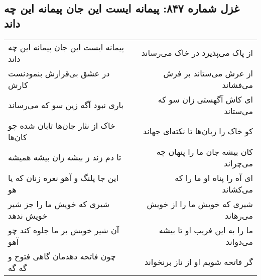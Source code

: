 \begin{center}
\section*{غزل شماره ۸۴۷: پیمانه ایست این جان پیمانه این چه داند}
\label{sec:0847}
\begin{longtable}{l p{0.5cm} r}
پیمانه ایست این جان پیمانه این چه داند
&&
از پاک می‌پذیرد در خاک می‌رساند
\\
در عشق بی‌قرارش بنمودنست کارش
&&
از عرش می‌ستاند بر فرش می‌فشاند
\\
باری نبود آگه زین سو که می‌رساند
&&
ای کاش آگهستی زان سو که می‌ستاند
\\
خاک از نثار جان‌ها تابان شده چو کان‌ها
&&
کو خاک را زبان‌ها تا نکته‌ای جهاند
\\
تا دم زند ز بیشه زان بیشه همیشه
&&
کان بیشه جان ما را پنهان چه می‌چراند
\\
این جا پلنگ و آهو نعره زنان که یا هو
&&
ای آه را پناه او ما را که می‌کشاند
\\
شیری که خویش ما را جز شیر خویش ندهد
&&
شیری که خویش ما را از خویش می‌رهاند
\\
آن شیر خویش بر ما جلوه کند چو آهو
&&
ما را به این فریب او تا بیشه می‌دواند
\\
چون فاتحه دهدمان گاهی فتوح و گه گه
&&
گر فاتحه شویم او از ناز برنخواند
\\
\end{longtable}
\end{center}
